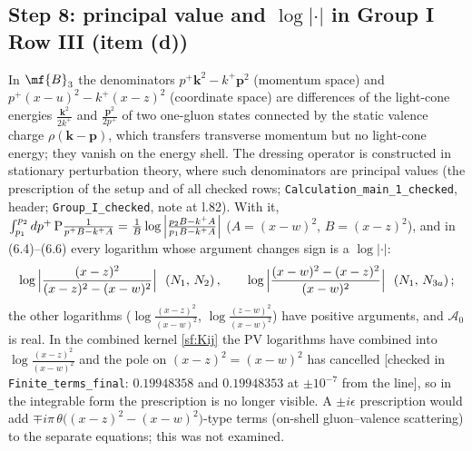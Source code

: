 \subsection{Step 8: principal value and $\log|\cdot|$ in Group I Row III (item (d))}
\noindent In $\mf{B}_{3}$ the denominators $p^{+}\mathbf{k}^{2}-k^{+}\mathbf{p}^{2}$ (momentum space) and $p^{+}(x-u)^{2}-k^{+}(x-z)^{2}$ (coordinate space) are differences of the light-cone energies $\frac{\mathbf{k}^{2}}{2k^{+}}$ and $\frac{\mathbf{p}^{2}}{2p^{+}}$ of two one-gluon states connected by the static valence charge $\rho(\mathbf{k}-\mathbf{p})$, which transfers transverse momentum but no light-cone energy; they vanish on the energy shell. The dressing operator is constructed in stationary perturbation theory, where such denominators are principal values (the prescription of the setup and of all checked rows; \texttt{Calculation\_main\_1\_checked}, header; \texttt{Group\_I\_checked}, note at l.82). With it, $\int_{p_{1}}^{p_{2}}dp^{+}\,{\rm P}\frac{1}{p^{+}B-k^{+}A}=\frac1B\log\Big|\frac{p_{2}B-k^{+}A}{p_{1}B-k^{+}A}\Big|$ ($A=(x-w)^{2}$, $B=(x-z)^{2}$), and in (6.4)--(6.6) every logarithm whose argument changes sign is a $\log|\cdot|$:
\begin{align}
\log\Big|\frac{(x-z)^{2}}{(x-z)^{2}-(x-w)^{2}}\Big|\ \ (N_{1},\,N_{2})\,,\qquad \log\Big|\frac{(x-w)^{2}-(x-z)^{2}}{(x-w)^{2}}\Big|\ \ (N_{1},\,N_{3a})\,;\notag
\end{align}
the other logarithms ($\log\frac{(x-z)^{2}}{(x-w)^{2}}$, $\log\frac{(z-w)^{2}}{(x-w)^{2}}$) have positive arguments, and $\mathcal{A}_{0}$ is real. In the combined kernel \eqref{sf:Kij} the PV logarithms have combined into $\log\frac{(x-z)^{2}}{(x-w)^{2}}$ and the pole on $(x-z)^{2}=(x-w)^{2}$ has cancelled [checked in \texttt{Finite\_terms\_final}: $0.19948358$ and $0.19948353$ at $\pm10^{-7}$ from the line], so in the integrable form the prescription is no longer visible. A $\pm i\epsilon$ prescription would add $\mp i\pi\,\theta\big((x-z)^{2}-(x-w)^{2}\big)$-type terms (on-shell gluon--valence scattering) to the separate equations; this was not examined.

